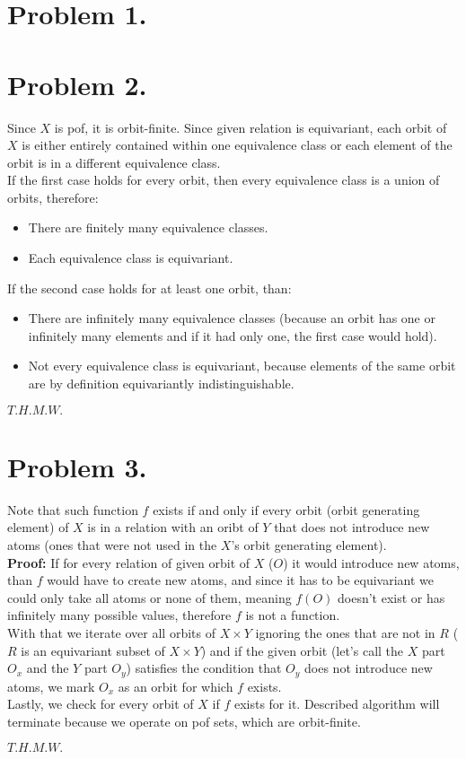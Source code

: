 \documentclass[12 pt]{article}
\begin{document}
\section{Problem 1.}
\section{Problem 2.}
Since $X$ is pof, it is orbit-finite. 
Since given relation is equivariant, each orbit of $X$ is either entirely contained within one
equivalence class or each element of the orbit is in a different equivalence class. \\

\noindent
If the first case holds for every orbit, then every equivalence class is a union of orbits, therefore:
\begin{itemize}
    \item There are finitely many equivalence classes.
    \item Each equivalence class is equivariant.
\end{itemize}

\noindent
If the second case holds for at least one orbit, than:
\begin{itemize}
    \item There are infinitely many equivalence classes (because an orbit has one or infinitely many elements and if it had only one, the first case would hold).
    \item Not every equivalence class is equivariant, because elements of the same orbit are by definition equivariantly indistinguishable.
\end{itemize}

$T.H.M.W.$

\section{Problem 3.}

Note that such function $f$ exists if and only if every orbit (orbit generating element) of $X$ is in a relation with an oribt of $Y$ that does not introduce
new atoms (ones that were not used in the $X$'s orbit generating element). \\

\noindent
\textbf{Proof:} If for every relation of given orbit of $X$ ($O$) it would introduce new atoms, than $f$ would have to create new atoms,
and since it has to be equivariant we could only take all atoms or none of them, meaning $f(O)$ doesn't exist or has infinitely many possible values,
therefore $f$ is not a function.\\

\noindent
With that we iterate over all orbits of $X \times Y$ ignoring the ones that are not in $R$ ($R$ is an equivariant subset of $X \times Y$) and
if the given orbit (let's call the $X$ part $O_x$ and the $Y$ part $O_y$) satisfies the condition that $O_y$ does not introduce new atoms, we
mark $O_x$ as an orbit for which $f$ exists. \\

\noindent
Lastly, we check for every orbit of $X$ if $f$ exists for it. Described algorithm will terminate because we operate on pof sets, which are orbit-finite.

$T.H.M.W.$
\end{document}
